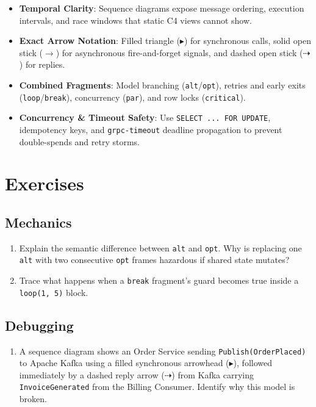 \begin{itemize}[leftmargin=18pt]
  \item \textbf{Temporal Clarity}: Sequence diagrams expose message ordering, execution intervals, and race windows that static C4 views cannot show.
  \item \textbf{Exact Arrow Notation}: Filled triangle ($\blacktriangleright$) for synchronous calls, solid open stick ($\rightarrow$) for asynchronous fire-and-forget signals, and dashed open stick ($\dashrightarrow$) for replies.
  \item \textbf{Combined Fragments}: Model branching (\texttt{alt}/\texttt{opt}), retries and early exits (\texttt{loop}/\texttt{break}), concurrency (\texttt{par}), and row locks (\texttt{critical}).
  \item \textbf{Concurrency \& Timeout Safety}: Use \texttt{SELECT ... FOR UPDATE}, idempotency keys, and \texttt{grpc-timeout} deadline propagation to prevent double-spends and retry storms.
\end{itemize}

\section{Exercises}

\subsection*{Mechanics}
\begin{enumerate}[label=\textbf{Exercise~\thechapter.\arabic*}, leftmargin=*]
  \item Explain the semantic difference between \texttt{alt} and \texttt{opt}. Why is replacing one \texttt{alt} with two consecutive \texttt{opt} frames hazardous if shared state mutates?
  \item Trace what happens when a \texttt{break} fragment's guard becomes true inside a \texttt{loop(1, 5)} block.
\end{enumerate}

\subsection*{Debugging}
\begin{enumerate}[label=\textbf{Exercise~\thechapter.\arabic*}, leftmargin=*, start=3]
  \item A sequence diagram shows an Order Service sending \texttt{Publish(OrderPlaced)} to Apache Kafka using a filled synchronous arrowhead ($\blacktriangleright$), followed immediately by a dashed reply arrow ($\dashrightarrow$) from Kafka carrying \texttt{InvoiceGenerated} from the Billing Consumer. Identify why this model is broken.
\end{enumerate}

